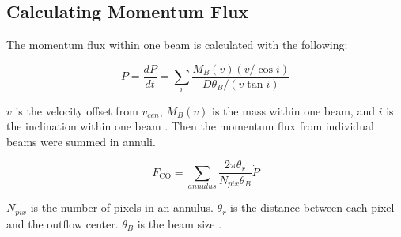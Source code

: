 \subsection{Calculating Momentum Flux}

The momentum flux within one beam is calculated with the following:

\begin{equation}
\dot{P} = \frac{dP}{dt} = \sum_{v} {\frac{M_B (v) (v/ \cos i)}{D\theta_B / (v \tan i)}}
\end{equation}

$v$ is the velocity offset from $v_{cen}$, $M_B (v)$ is the mass within one beam, and $i$ is the inclination within one beam \cite{hatchell2007star}.
Then the momentum flux from individual beams were summed in annuli. 

\begin{equation}
F_{\textrm{CO}} = \sum _{annulus} \frac{2\pi \theta_r}{N_{pix}\theta_B}\dot{P}	
\end{equation}

$N_{pix}$ is the number of pixels in an annulus. $\theta_r$ is the distance between each pixel and the outflow center. $\theta_B$ is the beam size \cite{hatchell2007star, van2013outflow}.
